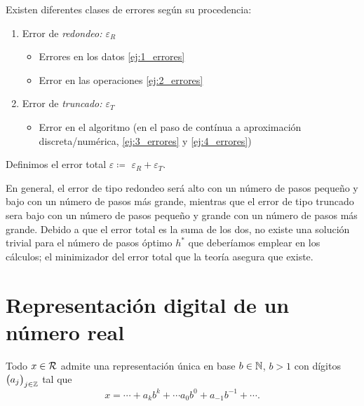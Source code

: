 \begin{defi}[Errores]
    Existen diferentes clases de errores según su procedencia:
    \begin{enumerate}
            \item Error de \it{redondeo}: $\varepsilon_R$
            \begin{itemize}
                    \item Errores en los datos \ref{ej:1_errores}
                    \item Error en las operaciones \ref{ej:2_errores}
            \end{itemize}
            \item Error de \it{truncado}: $\varepsilon_T$
            \begin{itemize}
                    \item Error en el algoritmo (en el paso de contínua a aproximación discreta/numérica, \ref{ej:3_errores} y \ref{ej:4_errores})
            \end{itemize}
    \end{enumerate}
\end{defi}

\begin{defi}
    Definimos el error total $\varepsilon \coloneqq$ $\varepsilon_R + \varepsilon_T$.
\end{defi}

\begin{obs}
    En general, el error de tipo redondeo será alto con un número de pasos pequeño y bajo con un número de pasos más grande, mientras que el error de tipo truncado sera bajo con un número de pasos pequeño y grande con un número de pasos más grande. Debido a que el error total es la suma de los dos, no existe una solución trivial para el número de pasos óptimo $h^*$ que deberíamos emplear en los cálculos; el minimizador del error total que la teoría asegura que existe.
\end{obs}

\section{Representación digital de un número real}
    
\begin{prop}
    Todo $x \in \mathcal{R}$ admite una representación única en base $b \in \mathbb{N}$, $b>1$ con dígitos $\left( a_j\right) _{j \in \mathbb{Z}}$ tal que 
    \[
            x = \cdots + a_kb^k + \cdots a_0b^0 + a_{-1}b^{-1} + \cdots \nonumber.
    \]
\end{prop}

